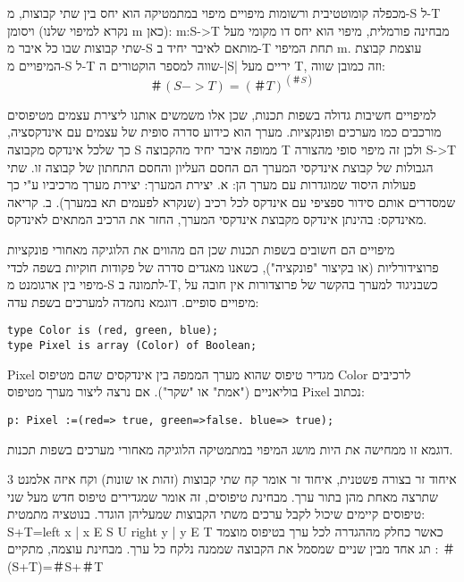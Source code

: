       מכפלה קומוטטיבית ורשומות
      מיפויים
      מיפוי במתמטיקה הוא יחס בין שתי קבוצות, מ-S ל-T ויסומן (נקרא למיפוי שלנו m כאן):
      m:S->T
      מבחינה פורמלית, מיפוי הוא יחס דו מקומי מעל שתי קבוצות שבו כל איבר מ-S מותאם לאיבר יחיד ב-T תחת המיפוי m.
      עוצמת קבוצת המיפויים מ-S ל-T שווה למספר הוקטורים ה-|S| יריים מעל T, וזה כמובן שווה:
      \begin{equation}
        ＃(S->T)=(＃T)^(＃S)
      \end{equation}

      למיפויים חשיבות גדולה בשפות תכנות, שכן אלו משמשים אותנו ליצירת עצמים מטיפוסים
      מורכבים כמו מערכים ופונקציות. מערך הוא כידוע סדרה סופית של עצמים עם אינדקסציה,
      כך שלכל אינדקס מקבוצה S ממופה איבר יחיד מהקבוצה T ולכן זה מיפוי סופי מהצורה
      S->T
      הגבולות של קבוצת אינדקסי המערך הם החסם העליון והחסם התחתון של קבוצה זו. שתי
      פעולות היסוד שמוגדרות עם מערך הן: א. יצירת המערך: יצירת מערך מרכיביו ע"י כך
      שמסדרים אותם סידור ספציפי עם אינדקס לכל רכיב (שנקרא לפעמים תא במערך).
      ב. קריאה מאינדקס: בהינתן אינדקס מקבוצת אינדקסי המערך, החזר את הרכיב המתאים לאינדקס.

      מיפויים הם חשובים בשפות תכנות שכן הם מהווים את הלוגיקה מאחורי פונקציות
      פרוצידורליות (או בקיצור "פונקציה"), כשאנו מאגדים סדרה של פקודות חוקיות בשפה
      לכדי מיפוי בין ארגומנט מ-S לתמונה ב-T, כשבניגוד למערך בהקשר של פרוצדורות אין
      חובה על מיפויים סופיים. דוגמא נחמדה למערכים בשפת עדה:

\begin{verbatim}
type Color is (red, green, blue);
type Pixel is array (Color) of Boolean;
\end{verbatim}

      Pixel מגדיר טיפוס שהוא מערך הממפה בין אינדקסים שהם מטיפוס Color לרכיבים בוליאניים ("אמת" או "שקר"). אם נרצה ליצור מערך מטיפוס Pixel נכתוב:

\begin{verbatim}
p: Pixel :=(red=> true, green=>false. blue=> true);
\end{verbatim}

      דוגמא זו ממחישה את היות מושג המיפוי במתמטיקה הלוגיקה מאחורי מערכים בשפות תכנות.

      3 איחוד זר
      בצורה פשטנית, איחוד זר אומר קח שתי קבוצות (זהות או שונות) וקח איזה אלמנט שתרצה מאחת מהן בתור ערך. מבחינת טיפוסים, זה אומר שמגדירים טיפוס חדש מעל שני טיפוסים קיימים שיכול לקבל ערכים משתי הקבוצות שמעליהן הוגדר. בנוטציה מתמטית:
      S+T={left x | x E S } U {right y | y E T}
      כאשר כחלק מההגדרה לכל ערך בטיפוס מוצמד תג אחד מבין שניים שמסמל את הקבוצה שממנה נלקח כל ערך.
      מבחינת עוצמה, מתקיים :
      ＃(S+T)=＃S+＃T

